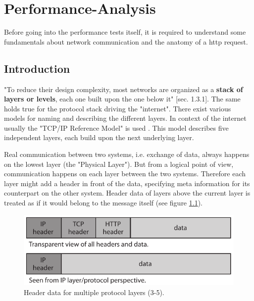 \chapter{Performance-Analysis}

Before going into the performance tests itself, it is required to understand some fundamentals about network communication and the anatomy of a \gls{http} request.
\\

\section{Introduction}

"To reduce their design complexity, most networks are organized as a \textbf{stack of layers or levels}, each one built upon the one below it" \cite{kn1}[sec. 1.3.1]. The same holds true for the protocol stack driving the "internet". There exist various models for naming and describing the different layers. In context of the internet usually the "TCP/IP Reference Model" is used \cite{kn1}. This model describes five independent layers, each build upon the next underlying layer. 

Real communication between two systems, i.e. exchange of data, always happens on the lowest layer (the "Physical Layer"). But from a logical point of view, communication happens on each layer between the two systems. Therefore each layer might add a header in front of the data, specifying meta information for its counterpart on the other system. Header data of layers above the current layer is treated as if it would belong to the message itself (see figure \ref{fig:header-layers}).

\begin{figure}[H]
	\centering
	\includegraphics[scale=1]{images/protocol-headers.pdf}
	\caption{Header data for multiple protocol layers (3-5).}
	\label{fig:header-layers}
\end{figure}

